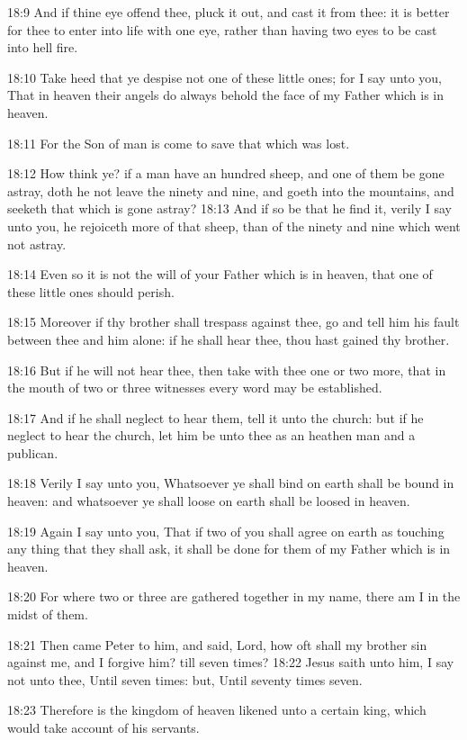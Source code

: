 18:9 And if thine eye offend thee, pluck it out, and cast it from thee: it is better for thee to enter into life with one eye, rather than having two eyes to be cast into hell fire.

18:10 Take heed that ye despise not one of these little ones; for I say unto you, That in heaven their angels do always behold the face of my Father which is in heaven.

18:11 For the Son of man is come to save that which was lost.

18:12 How think ye? if a man have an hundred sheep, and one of them be gone astray, doth he not leave the ninety and nine, and goeth into the mountains, and seeketh that which is gone astray?  18:13 And if so be that he find it, verily I say unto you, he rejoiceth more of that sheep, than of the ninety and nine which went not astray.

18:14 Even so it is not the will of your Father which is in heaven, that one of these little ones should perish.

18:15 Moreover if thy brother shall trespass against thee, go and tell him his fault between thee and him alone: if he shall hear thee, thou hast gained thy brother.

18:16 But if he will not hear thee, then take with thee one or two more, that in the mouth of two or three witnesses every word may be established.

18:17 And if he shall neglect to hear them, tell it unto the church: but if he neglect to hear the church, let him be unto thee as an heathen man and a publican.

18:18 Verily I say unto you, Whatsoever ye shall bind on earth shall be bound in heaven: and whatsoever ye shall loose on earth shall be loosed in heaven.

18:19 Again I say unto you, That if two of you shall agree on earth as touching any thing that they shall ask, it shall be done for them of my Father which is in heaven.

18:20 For where two or three are gathered together in my name, there am I in the midst of them.

18:21 Then came Peter to him, and said, Lord, how oft shall my brother sin against me, and I forgive him? till seven times?  18:22 Jesus saith unto him, I say not unto thee, Until seven times: but, Until seventy times seven.

18:23 Therefore is the kingdom of heaven likened unto a certain king, which would take account of his servants.

